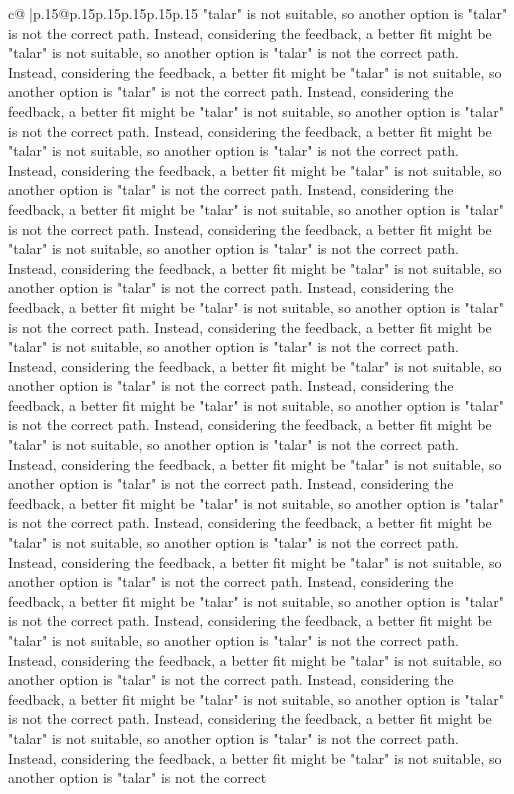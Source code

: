 \documentclass{article}
\begin{document}
{\begin{supertabular}{c@{$\;$}|p{.15\linewidth}@{}p{.15\linewidth}p{.15\linewidth}p{.15\linewidth}p{.15\linewidth}p{.15\linewidth}}
{{{"talar" is not suitable, so another option is "talar" is not the correct path. Instead, considering the feedback, a better fit might be "talar" is not suitable, so another option is "talar" is not the correct path. Instead, considering the feedback, a better fit might be "talar" is not suitable, so another option is "talar" is not the correct path. Instead, considering the feedback, a better fit might be "talar" is not suitable, so another option is "talar" is not the correct path. Instead, considering the feedback, a better fit might be "talar" is not suitable, so another option is "talar" is not the correct path. Instead, considering the feedback, a better fit might be "talar" is not suitable, so another option is "talar" is not the correct path. Instead, considering the feedback, a better fit might be "talar" is not suitable, so another option is "talar" is not the correct path. Instead, considering the feedback, a better fit might be "talar" is not suitable, so another option is "talar" is not the correct path. Instead, considering the feedback, a better fit might be "talar" is not suitable, so another option is "talar" is not the correct path. Instead, considering the feedback, a better fit might be "talar" is not suitable, so another option is "talar" is not the correct path. Instead, considering the feedback, a better fit might be "talar" is not suitable, so another option is "talar" is not the correct path. Instead, considering the feedback, a better fit might be "talar" is not suitable, so another option is "talar" is not the correct path. Instead, considering the feedback, a better fit might be "talar" is not suitable, so another option is "talar" is not the correct path. Instead, considering the feedback, a better fit might be "talar" is not suitable, so another option is "talar" is not the correct path. Instead, considering the feedback, a better fit might be "talar" is not suitable, so another option is "talar" is not the correct path. Instead, considering the feedback, a better fit might be "talar" is not suitable, so another option is "talar" is not the correct path. Instead, considering the feedback, a better fit might be "talar" is not suitable, so another option is "talar" is not the correct path. Instead, considering the feedback, a better fit might be "talar" is not suitable, so another option is "talar" is not the correct path. Instead, considering the feedback, a better fit might be "talar" is not suitable, so another option is "talar" is not the correct path. Instead, considering the feedback, a better fit might be "talar" is not suitable, so another option is "talar" is not the correct path. Instead, considering the feedback, a better fit might be "talar" is not suitable, so another option is "talar" is not the correct path. Instead, considering the feedback, a better fit might be "talar" is not suitable, so another option is "talar" is not the correct path. Instead, considering the feedback, a better fit might be "talar" is not suitable, so another option is "talar" is not the correct path. Instead, considering the feedback, a better fit might be "talar" is not suitable, so another option is "talar" is not the correct }}}
\end{supertabular}}
\end{document}
